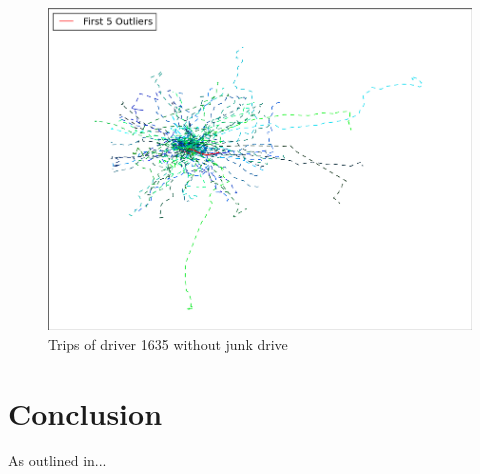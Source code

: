 \documentclass{vldb}
\begin{document}
\begin{figure}
\centering
\includegraphics[width=0.8\linewidth]{"pics/outliers_junk/D_1080_clean"} %
\caption{Trips of driver 1635 without junk drive}
\label{fig:d-1635}
\end{figure}


\section{Conclusion}
\label{sec:Conclusion}
As outlined in...


\end{document}
